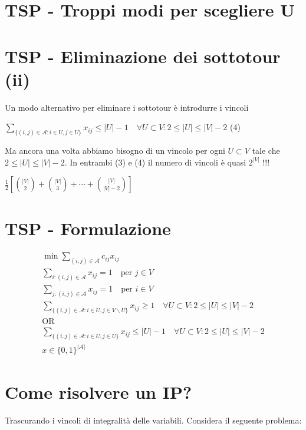 \documentclass[a4paper, 11pt]{article}
\begin{document}
        \section*{TSP - Troppi modi per scegliere U}

        \section*{TSP - Eliminazione dei sottotour (ii)}

        Un modo alternativo per eliminare i sottotour è introdurre i vincoli

        $\sum_{\{(i,j)\in\mathcal{A}:i\in U,j\in U\}}x_{ij} \le |U| - 1 \quad \forall U \subset V : 2 \le |U| \le |V| - 2$ (4)

        Ma ancora una volta abbiamo bisogno di un vincolo per ogni $U \subset V$ tale che
        $2 \le |U| \le |V| - 2$.
        In entrambi (3) e (4) il numero di vincoli è quasi $2^{|V|}$ !!!

        $\frac{1}{2} \left[ \binom{|V|}{2} + \binom{|V|}{3} + \cdots + \binom{|V|}{|V| - 2} \right]$

        \section*{TSP - Formulazione}

        \begin{align*}
        \min \sum_{(i,j)\in\mathcal{A}} c_{ij}x_{ij} \\
        \sum_{i:(i,j)\in\mathcal{A}} x_{ij} = 1 \quad \text{per } j \in V \\
        \sum_{j:(i,j)\in\mathcal{A}} x_{ij} = 1 \quad \text{per } i \in V \\
        \sum_{\{(i,j)\in\mathcal{A}:i\in U,j\in V \backslash U\}} x_{ij} \ge 1 \quad \forall U \subset V : 2 \le |U| \le |V| - 2 \\
        \text{OR} \\
        \sum_{\{(i,j)\in\mathcal{A}:i\in U,j\in U\}} x_{ij} \le |U| - 1 \quad \forall U \subset V : 2 \le |U| \le |V| - 2 \\
        x \in \{0, 1\}^{|\mathcal{A}|}
        \end{align*}

        \section*{Come risolvere un IP?}

        Trascurando i vincoli di integralità delle variabili. Considera il seguente problema:
\end{document}

